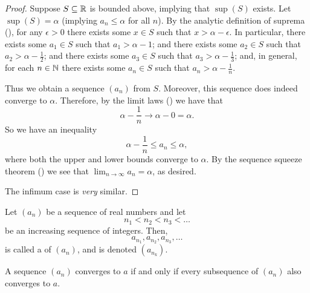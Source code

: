 \begin{proof}
  Suppose $S \subseteq \mathbb R$ is bounded above, implying that $\sup(S)$
  exists. Let $\sup(S) = \alpha$ (implying $a_n \leq \alpha$ for all
  $n$). By the analytic definition of suprema
  (), for any
  $\epsilon > 0$ there exists some $x \in S$ such that $x > \alpha -
  \epsilon$. In particular, there exists some $a_1 \in S$ such that
  $a_1 > \alpha - 1$; and there exists some $a_2 \in S$ such that
  $a_2 > \alpha - \frac{1}{2}$; and there exists some $a_3 \in S$
  such that $a_3 > \alpha - \frac{1}{3}$; and, in general, for each
  $n \in \mathbb N$ there exists some $a_n \in S$ such that $a_n > \alpha -
  \frac{1}{n}$.

  Thus we obtain a sequence $(a_n)$ from $S$. Moreover, this sequence
  does indeed converge to $\alpha$. Therefore, by
  the limit laws () we have that
  \[ \alpha - \frac{1}{n} \to \alpha - 0 = \alpha. \]
  So we have an inequality
  \[ \alpha - \frac{1}{n} \leq a_n \leq \alpha, \]
  where both the upper and lower bounds converge to $\alpha$. By the
  sequence squeeze theorem () we see that $\lim_{n \to
  \infty} a_n = \alpha$, as desired.

  The infimum case is \textit{very} similar.
\end{proof}

\begin{definition}
  Let $(a_n)$ be a sequence of real numbers and let
  \[ n_1 < n_2 < n_3 < \dots \]
  be an increasing sequence of integers. Then,
  \[ a_{n_1}, a_{n_2}, a_{n_3}, \dots \]
  is called a  of $(a_n)$, and is denoted $(a_{n_k})$.
\end{definition}

\begin{proposition}
  A sequence $(a_n)$ converges to $a$ if and only if every
  subsequence of $(a_n)$ also converges to $a$.
\end{proposition}

